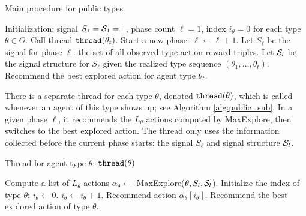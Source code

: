  \begin{algorithm}[t]
    \caption{Main procedure for public types }
    	\label{alg:public_main}
    \begin{algorithmic}[1]
    \STATE Initialization: signal $S_1 = \S_1 = \perp$,
             phase count $\ell = 1$, index $i_{\theta} = 0$ for each type $\theta \in \varTheta$.
		\IF {$\ell \leq |\A|\cdot |\varTheta|$}
		 \STATE {}
		Call thread $\thread(\theta_t)$.
				\STATE Start a new phase: $\ell \leftarrow \ell + 1$.
				\STATE Let $S_\ell$ be the signal for phase $\ell$:
                 the set of all observed type-action-reward triples.
        \STATE Let $\S_\ell$ be the signal structure for $S_\ell$ given the realized type sequence $(\theta_1,...,\theta_t)$.
			\ENDIF
		\ELSE
			\STATE {}
			Recommend the best explored action for agent type $\theta_t$.
		\ENDIF
	\ENDFOR
     \end{algorithmic}
\end{algorithm}

There is a separate thread for each type $\theta$, denoted $\thread(\theta)$,  which is called whenever an agent of this type shows up; see Algorithm \ref{alg:public_sub}. In a given phase $\ell$, it recommends the $L_{\theta}$ actions computed by MaxExplore, then switches to the best explored action. The thread only uses the information collected before the current phase starts: the signal $S_\ell$ and signal structure $\S_\ell$.

 \begin{algorithm}[h]
    \caption{Thread for agent type $\theta$: $\thread(\theta)$ }
    	\label{alg:public_sub}
    \begin{algorithmic}[1]
			\STATE Compute a list of $L_{\theta}$ actions $\alpha_{\theta} \leftarrow $ MaxExplore($\theta, S_\ell, \S_\ell$).
			\STATE Initialize the index of type $\theta$: $i_{\theta} \leftarrow 0$.
		\ENDIF
		\STATE $i_{\theta} \leftarrow i_{\theta} + 1$.
			\STATE Recommend action $\alpha_{\theta} [i_{\theta}]$.
		\ELSE
			\STATE Recommend the best explored action of type $\theta$.
		\ENDIF
     \end{algorithmic}
\end{algorithm}

